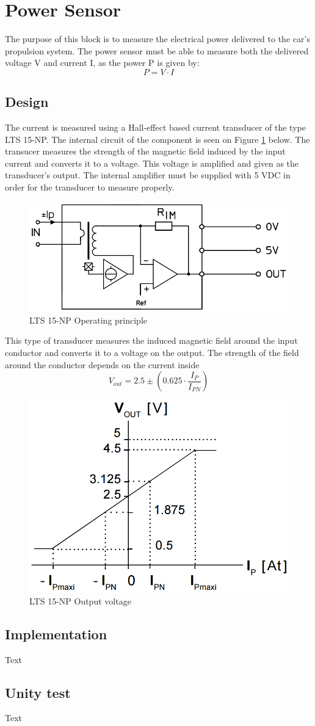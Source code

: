 \newpage
\section{Power Sensor}
The purpose of this block is to measure the electrical power delivered to the car's propulsion system. The power sensor must be able to measure both the delivered voltage V and  current I, as the power P is given by:
\begin{equation}
	P = V \cdot I
\end{equation}

\subsection{Design}
The current is measured using a Hall-effect based current transducer of the type LTS 15-NP. The internal circuit of the component is seen on Figure \ref{fig:LTS_operating_principle} below. The transucer measures the strength of the magnetic field induced by the input current and converts it to a voltage. This voltage is amplified and given as the transducer's output. The internal amplifier must be supplied with 5 VDC in order for the transducer to measure properly.

\begin{figure}[H]
	\centering
	\includegraphics[width=0.5\linewidth]{Hardware/Pictures/LTS_circuit}
	\caption{LTS 15-NP Operating principle}
	\label{fig:LTS_operating_principle}
\end{figure}

This type of transducer measures the induced magnetic field around the input conductor and converts it to a voltage on the output. The strength of the field around the conductor depends on the current inside
\begin{equation}
	V_{out} = 2.5 \pm \left( 0.625 \cdot \frac{I_{P}}{I_{PN}} \right)
\end{equation}

\begin{figure}[H]
	\centering
	\includegraphics[width=0.5\linewidth]{Hardware/Pictures/LTS_output}
	\caption{LTS 15-NP Output voltage}
	\label{fig:LTS_output}
\end{figure}

\subsection{Implementation}
Text

\subsection{Unity test}
Text